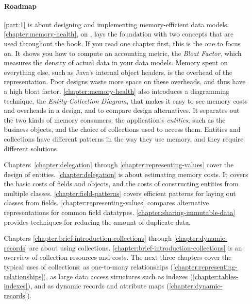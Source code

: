\paragraph{Roadmap}\autoref{part:1} is about designing and implementing
memory-efficient data models.
\autoref{chapter:memory-health}, on , lays the
foundation with two concepts that are used throughout the book. If you read one chapter first,
this is the one to focus on.
It shows you how to compute an accounting metric,
the \emph{Bloat Factor}, which measures the density of actual data in your
data models. Memory spent on everything else, such as
Java's internal object headers, is the overhead of the representation.
Poor designs waste more space on these overheads, and thus have a high bloat factor. \autoref{chapter:memory-health} also
introduces a diagramming technique,
the \emph{Entity-Collection Diagram}, that makes it easy to see memory costs and overheads in a design,
and to compare design alternatives.
It separates out the two kinds of memory consumers:
%
the application's \emph{entities}, such as the
business objects, and the choice of collections used to access them. Entities and collections have
different patterns in the way they use memory, and they require different solutions.

Chapters~\ref{chapter:delegation} through
\ref{chapter:representing-values} cover the design of
entities. \autoref{chapter:delegation} is about estimating memory costs. It covers the basic costs of fields
and objects, and the costs of constructing entities from multiple classes.
\autoref{chapter:field-patterns} covers efficient patterns for laying out classes from fields.
\autoref{chapter:representing-values} compares alternative representations for common field datatypes. 
\autoref{chapter:sharing-immutable-data} provides techniques for
reducing the amount of duplicate data.

Chapters \ref{chapter:brief-introduction-collections} through
\ref{chapter:dynamic-records} are about
using collections. \autoref{chapter:brief-introduction-collections} is
an overview of collection resources and costs.
The next three chapters cover the typical uses of collections:
as one-to-many relationships (\autoref{chapter:representing-relationships}),
as large data access structures such as indexes
(\autoref{chapter:tables-indexes}), and as dynamic records and attribute maps
(\autoref{chapter:dynamic-records}).


